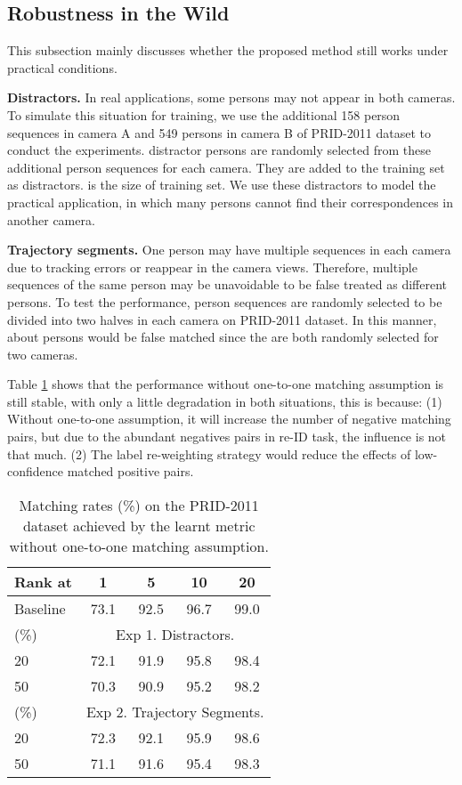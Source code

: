 \documentclass[10pt,twocolumn,letterpaper]{article}
\begin{document}
\subsection{Robustness in the Wild}\label{sec:exp_o}
This subsection mainly discusses whether the proposed method still works under practical conditions.

\textbf{Distractors.} In real applications, some persons may not appear in both cameras. To simulate this situation for training, we use the additional 158 person sequences in camera A and 549 persons in camera B of PRID-2011 dataset to conduct the experiments.  distractor persons are randomly selected from these additional person sequences for each camera. They are added to the training set as distractors.  is the size of training set. We use these distractors to model the practical application, in which many persons cannot find their correspondences in another camera.

\textbf{Trajectory segments.} One person may have multiple sequences in each camera due to tracking errors or reappear in the camera views. Therefore, multiple sequences of the same person may be unavoidable to be false treated as different persons. To test the performance,  person sequences are randomly selected to be divided into two halves in each camera on PRID-2011 dataset. In this manner, about  persons would be false matched since the  are both randomly selected for two cameras.

Table \ref{tab:exp_o} shows that the performance without one-to-one matching assumption is still stable, with only a little degradation in both situations, this is because: (1) Without one-to-one assumption, it will increase the number of negative matching pairs, but due to the abundant negatives pairs in re-ID task, the influence is not that much. (2) The label re-weighting strategy would reduce the effects of low-confidence matched positive pairs.
\begin{table}[t]\small
\centering
\setlength{\tabcolsep}{12pt}
  \begin{tabular*}{\columnwidth}{l|cccc}
  \hline
  Rank at  & 1  &5  & 10    & 20 \\\hline
  Baseline  & 73.1  &92.5   & 96.7   &99.0\\ \hline
  (\%)    & \multicolumn{4}{c}{Exp 1. Distractors.} \\ \hline
  20       & 72.1  &91.9 & 95.8   & 98.4\\
  50       & 70.3 &90.9 & 95.2  & 98.2\\ \hline
  (\%)    &\multicolumn{4}{c}{Exp 2. Trajectory Segments.} \\ \hline
  20       & 72.3  &92.1 & 95.9   & 98.6\\
  50       & 71.1  &91.6 & 95.4   & 98.3\\ \hline
 \end{tabular*}
 \caption{\label{tab:exp_o}\small{Matching rates (\%) on the PRID-2011 dataset achieved by the learnt metric without one-to-one matching assumption.}}
\end{table}
\end{document}
